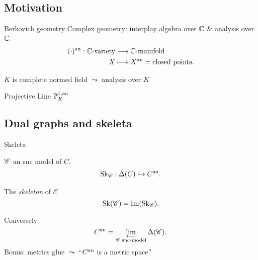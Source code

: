 
\subsection{Motivation}\label{sec:motivation}
\begin{frame}{Berkovich geometry}
	Complex geometry: interplay algebra over $\mathbb C$ \& analysis over $\mathbb C$. 
	\begin{align*}
		(\cdot ){}^{\text{an}} : \mathbb C\text{-variety} &\longrightarrow \mathbb C\text{-manifold} \\
		X &\longmapsto X{}^{\text{an}} = \text{closed points} 
	.\end{align*}
	\pause

	$K$ is complete normed field $\leadsto$ analysis over $K$ 
\end{frame}

\begin{frame}{Projective Line $\mathbb P^{1, \text{an}}_{K}$}
\end{frame}

\subsection{Dual graphs and skeleta} \label{sec:dual_graphs_and_skeleta}
\begin{frame}{Skeleta}
	\begin{minipage}{.49\textwidth}
	 $\mathscr C$ an snc model of  $C$. 
	 \begin{align*}
		 \operatorname{Sk}_{\mathscr C}: \Delta(C) \hookrightarrow C{}^{\text{an}}
	 .\end{align*}
	\end{minipage}\;\;
	\begin{minipage}{.48\textwidth}
	 \begin{definition}
		 The \emph{skeleton} of $\mathscr C$
	 	\[
			\operatorname{Sk}(\mathscr C) = \operatorname{Im} (\operatorname{Sk}_{\mathscr C})
	 	.\] 
	 \end{definition}
	\end{minipage}

	\bigskip
	\pause

	 Conversely \[
		 C{}^{\text{an}} = \varprojlim_{\mathscr C \text{ snc-model}} \Delta(\mathscr C)
	 .\] 
	 Bonus: metrics glue $\leadsto$ ``$C{}^{\text{an}}$ is a metric space''
\end{frame}


